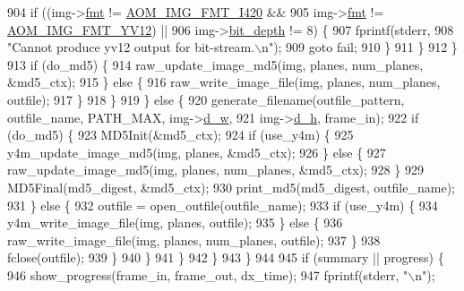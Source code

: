 \begin{DoxyCodeInclude}
{{{{{{{{{{{{{{{{{{{{{{{{{{{{{{{{{{{{{{{{{{{{{{904                 \textcolor{keywordflow}{if} ((img->\hyperlink{structaom__image_a6c64b1ab918d80d52eb8f5d6d957e825}{fmt} != \hyperlink{aom__image_8h_a930317c04b4bd0a660bb5e744055523cabd778a3d697463e89d12a1117f417b60}{AOM\_IMG\_FMT\_I420} &&
905                      img->\hyperlink{structaom__image_a6c64b1ab918d80d52eb8f5d6d957e825}{fmt} != \hyperlink{aom__image_8h_a930317c04b4bd0a660bb5e744055523cad28244100a2754409f285b77a3db90a0}{AOM\_IMG\_FMT\_YV12}) ||
906                     img->\hyperlink{structaom__image_a46ed9ffd741938d306a0db5a24bdcf8e}{bit\_depth} != 8) \{
907                   fprintf(stderr,
908                           \textcolor{stringliteral}{"Cannot produce yv12 output for bit-stream.\(\backslash\)n"});
909                   \textcolor{keywordflow}{goto} fail;
910                 \}
911               \}
912             \}
913             \textcolor{keywordflow}{if} (do\_md5) \{
914               raw\_update\_image\_md5(img, planes, num\_planes, &md5\_ctx);
915             \} \textcolor{keywordflow}{else} \{
916               raw\_write\_image\_file(img, planes, num\_planes, outfile);
917             \}
918           \}
919         \} \textcolor{keywordflow}{else} \{
920           generate\_filename(outfile\_pattern, outfile\_name, PATH\_MAX, img->\hyperlink{structaom__image_a89f80b1f58d608b9d2080635f4359034}{d\_w},
921                             img->\hyperlink{structaom__image_ab986419a1f0fff93a2dc505f47194988}{d\_h}, frame\_in);
922           \textcolor{keywordflow}{if} (do\_md5) \{
923             MD5Init(&md5\_ctx);
924             \textcolor{keywordflow}{if} (use\_y4m) \{
925               y4m\_update\_image\_md5(img, planes, &md5\_ctx);
926             \} \textcolor{keywordflow}{else} \{
927               raw\_update\_image\_md5(img, planes, num\_planes, &md5\_ctx);
928             \}
929             MD5Final(md5\_digest, &md5\_ctx);
930             print\_md5(md5\_digest, outfile\_name);
931           \} \textcolor{keywordflow}{else} \{
932             outfile = open\_outfile(outfile\_name);
933             \textcolor{keywordflow}{if} (use\_y4m) \{
934               y4m\_write\_image\_file(img, planes, outfile);
935             \} \textcolor{keywordflow}{else} \{
936               raw\_write\_image\_file(img, planes, num\_planes, outfile);
937             \}
938             fclose(outfile);
939           \}
940         \}
941       \}
942     \}
943   \}
944 
945   \textcolor{keywordflow}{if} (summary || progress) \{
946     show\_progress(frame\_in, frame\_out, dx\_time);
947     fprintf(stderr, \textcolor{stringliteral}{"\(\backslash\)n"});
}}}}}}}}}}}}}}}}}}}}}}}}}}}}}}}}}}}}}}}}}}}}}}
\end{DoxyCodeInclude}
